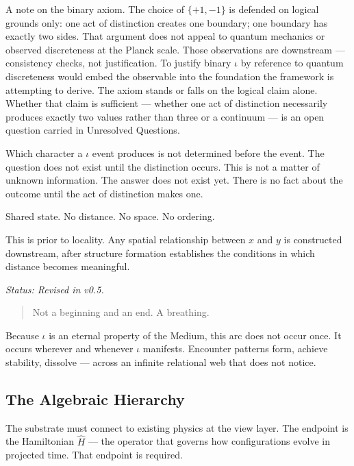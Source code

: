\documentclass[11pt,letterpaper]{article}
\begin{document}
A note on the binary axiom. The choice of \(\{+1, -1\}\) is defended on logical grounds only: one act of distinction creates one boundary; one boundary has exactly two sides. That argument does not appeal to quantum mechanics or observed discreteness at the Planck scale. Those observations are downstream --- consistency checks, not justification. To justify binary \(\iota\) by reference to quantum discreteness would embed the observable into the foundation the framework is attempting to derive. The axiom stands or falls on the logical claim alone. Whether that claim is sufficient --- whether one act of distinction necessarily produces exactly two values rather than three or a continuum --- is an open question carried in Unresolved Questions.

Which character a \(\iota\) event produces is not determined before the event. The question does not exist until the distinction occurs. This is not a matter of unknown information. The answer does not exist yet. There is no fact about the outcome until the act of distinction makes one.

\begin{center}
Shared state. No distance. No space. No ordering.
\end{center}

This is prior to locality. Any spatial relationship between \(x\) and \(y\) is constructed downstream, after structure formation establishes the conditions in which distance becomes meaningful.

\emph{Status: Revised in v0.5.}

\begin{quote}
Not a beginning and an end. A breathing.
\end{quote}

Because \(\iota\) is an eternal property of the Medium, this arc does not occur once. It occurs wherever and whenever \(\iota\) manifests. Encounter patterns form, achieve stability, dissolve --- across an infinite relational web that does not notice.

\subsection{The Algebraic Hierarchy}
\label{sec:org7befce5}

The substrate must connect to existing physics at the view layer. The endpoint is the Hamiltonian \(\hat{H}\) --- the operator that governs how configurations evolve in projected time. That endpoint is required.
\end{document}
